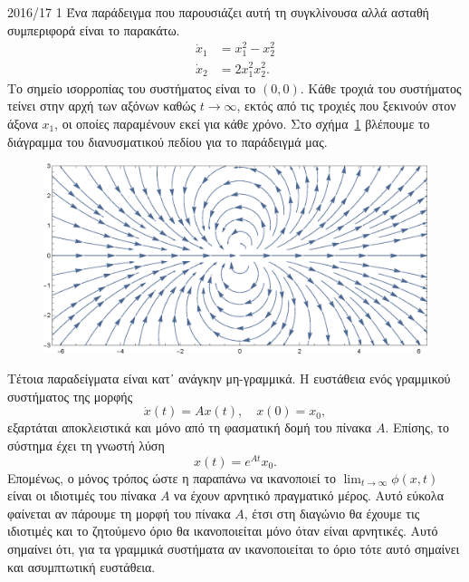 \begin{solution}{2016/17 1}
    Ένα παράδειγμα που παρουσιάζει αυτή τη συγκλίνουσα αλλά ασταθή συμπεριφορά
    είναι το παρακάτω.
    \begin{align*}
        \dot{x}_1 &= x_1^2 - x_2^2 \\
        \dot{x}_2 &= 2x_1^2x_2^2.
    \end{align*}
    Το σημείο ισορροπίας του συστήματος είναι το \( (0, 0) \). Κάθε τροχιά του
    συστήματος τείνει στην αρχή των αξόνων καθώς \( t \to \infty \), εκτός από
    τις τροχιές που ξεκινούν στον άξονα \( x_1 \), οι οποίες παραμένουν εκεί για
    κάθε χρόνο. Στο σχήμα~\ref{fig:ex1_unstable_convergent_example} βλέπουμε το
    διάγραμμα του διανυσματικού πεδίου για το παράδειγμά μας.
    \begin{figure}[h]
        \centering
        \includegraphics[width=1\textwidth]{figures/ex1_unstableConvergentExample.eps}
        \caption{}
        \label{fig:ex1_unstable_convergent_example}
    \end{figure}

    Τέτοια παραδείγματα είναι κατ᾽ ανάγκην μη-γραμμικά. Η ευστάθεια ενός
    γραμμικού συστήματος της μορφής
    \begin{equation*}
        \dot{x}(t) = Ax(t), \quad x(0) = x_0,
    \end{equation*}
    εξαρτάται αποκλειστικά και μόνο από τη φασματική δομή του πίνακα \( A \).
    Επίσης, το σύστημα έχει τη γνωστή λύση
    \begin{equation*}
        x(t) = e^{At}x_0.
    \end{equation*}
    Επομένως, ο μόνος τρόπος ώστε η παραπάνω να ικανοποιεί το \( \lim_{t \to
    \infty} \phi(x, t) \) είναι οι ιδιοτιμές του πίνακα \( A \) να έχουν
    αρνητικό πραγματικό μέρος. Αυτό εύκολα φαίνεται αν πάρουμε τη μορφή
     του πίνακα \( A \), έτσι στη διαγώνιο θα έχουμε τις ιδιοτιμές
    και το ζητούμενο όριο θα ικανοποιείται μόνο όταν είναι αρνητικές. Αυτό
    σημαίνει ότι, για τα γραμμικά συστήματα αν ικανοποιείται το όριο τότε αυτό
    σημαίνει και ασυμπτωτική ευστάθεια.
\end{solution}

